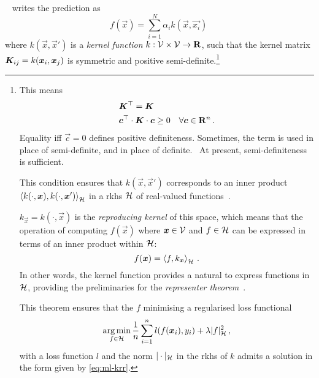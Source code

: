 ~\cite{r2015Bq} writes the prediction as
\begin{equation}
	f(\vec{x}) = \sum_{i=1}^N \alpha_i k(\vec{x}, \vec{x_i}) \, \label{eq:ml-krr}
\end{equation}
where $k(\vec{x}, \vec{x}')$ is a \emph{kernel function} $k: \mathcal{V} \times \mathcal{V} \rightarrow {\bf R}$,  such that the kernel matrix $\boldsymbol{K}_{ij} = k(\boldsymbol{x}_i, \boldsymbol{x}_j)$ is symmetric and positive semi-definite.\footnote[][-12\baselineskip]{
	This means
	\begin{align*}
		&\boldsymbol{K}^\top = \boldsymbol{K}\\
		&\boldsymbol{c}^\top \cdot \boldsymbol{K} \cdot \boldsymbol{c} \geq 0 \quad \forall \boldsymbol{c} \in {\bf R}^n \, .
	\end{align*}
	Equality iff $\vec{c} = 0$ defines positive definiteness.
	Sometimes, the term  is used in place of semi-definite, and  in place of definite.~\cite{hss2008m}
	At present, semi-definiteness is sufficient.

	This condition ensures that $k(\vec{x}, \vec{x}')$ corresponds to an inner product $\braket{k(\cdot, \boldsymbol{x}),k(\cdot, \boldsymbol{x}')}_{\mathcal{H}}$ in a \gls{rkhs} $\mathcal{H}$ of real-valued functions~\cite{a1950m}.

	$k_{\vec{x}} = k(\cdot, \vec{x})$ is the \emph{reproducing kernel} of this space, which means that the operation of computing $f(\vec{x})$ where $\boldsymbol{x} \in \mathcal{V}$ and $f \in \mathcal{H}$ can be expressed in terms of an inner product within $\mathcal{H}$:
	\begin{equation*}
		f(\boldsymbol{x}) = \braket{f, k_{\boldsymbol{x}}}_{\mathcal{H}} \, .
	\end{equation*}
	In other words, the kernel function provides a natural  to express functions in $\mathcal{H}$, providing the preliminaries for the \emph{representer theorem}~\cite{kw1971m,shs2001m}.

	This theorem ensures that the $f$ minimising a regularised loss functional
	\begin{equation*}
		\operatorname*{arg\,min}_{f \in \mathcal{H}} \frac{1}{n} \sum_{i=1}^n l(f(\boldsymbol{x}_i), y_i) + \lambda |f|_{\mathcal{H}}^2 \, ,
	\end{equation*}
	with a loss function $l$ and the norm $|\cdot|_{\mathcal{H}}$ in the \gls{rkhs} of $k$ admits a solution in the form given by \cref{eq:ml-krr}.
}

